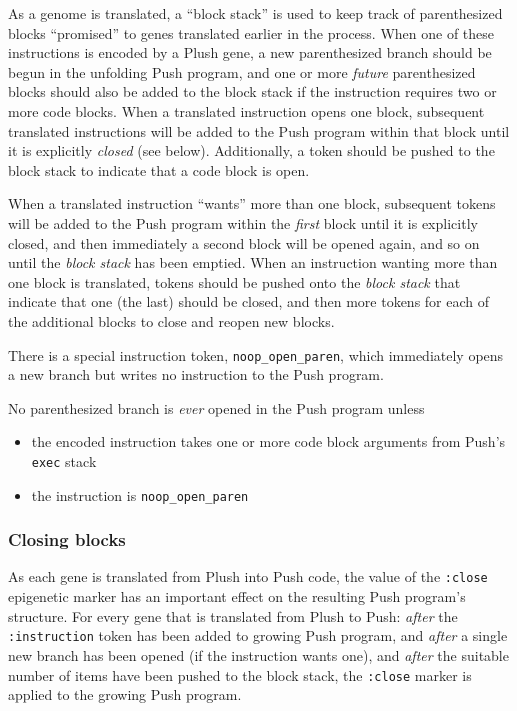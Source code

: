 \documentclass[graybox]{svmult}
\begin{document}
As a genome is translated, a ``block stack'' is used to keep track of parenthesized blocks ``promised'' to genes translated earlier in the process.
When one of these instructions is encoded by a Plush gene, a new
parenthesized branch should be begun in the unfolding Push program, and one or
more \textit{future} parenthesized blocks should also be added to the block stack if the instruction requires two or more code blocks.
When a translated instruction opens one block, subsequent translated instructions will be added to the Push program within that block until it is explicitly \textit{closed} (see below). Additionally, a token should be pushed to the block stack to indicate that a code block is open.

When a translated instruction ``wants'' more than one block, subsequent tokens will be added to the Push program within the \textit{first} block until it is explicitly closed, and then immediately a second block will be opened again, and so on until the \textit{block stack} has been emptied. When an instruction wanting more than one block is translated, tokens should be pushed onto the \textit{block stack} that indicate that one (the last) should be closed, and then more tokens for each of the additional blocks to close and reopen new blocks.


There is a special instruction token, \texttt{noop\_open\_paren}, which immediately opens a new branch but writes no instruction to the Push program.

No parenthesized branch is \textit{ever} opened in the Push program unless

\begin{itemize}

\item the encoded instruction takes one or more code block arguments from Push's \texttt{exec} stack
\item the instruction is \texttt{noop\_open\_paren}

\end{itemize}

\subsubsection{Closing blocks}

As each gene is translated from Plush into Push code, the value of the \texttt{:close} epigenetic marker has an important effect on the resulting Push program's structure. For every gene that is translated from Plush to Push: \textit{after} the \texttt{:instruction} token has been added to growing Push program, and \textit{after} a single new branch has been opened (if the instruction wants one), and \textit{after} the suitable number of items have been pushed to the block stack, the \texttt{:close} marker is applied to the growing Push program.
\end{document}
